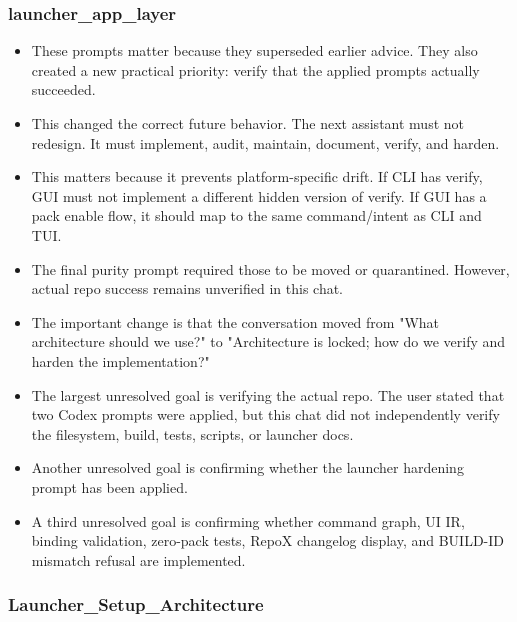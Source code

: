 \documentclass[11pt,a4paper]{report}
\begin{document}
\subsubsection{launcher\_app\_layer}

\begin{itemize}
\item These prompts matter because they superseded earlier advice. They also created a new practical priority: verify that the applied prompts actually succeeded.
\item This changed the correct future behavior. The next assistant must not redesign. It must implement, audit, maintain, document, verify, and harden.
\item This matters because it prevents platform-specific drift. If CLI has verify, GUI must not implement a different hidden version of verify. If GUI has a pack enable flow, it should map to the same command/intent as CLI and TUI.
\item The final purity prompt required those to be moved or quarantined. However, actual repo success remains unverified in this chat.
\item The important change is that the conversation moved from "What architecture should we use?" to "Architecture is locked; how do we verify and harden the implementation?"
\item The largest unresolved goal is verifying the actual repo. The user stated that two Codex prompts were applied, but this chat did not independently verify the filesystem, build, tests, scripts, or launcher docs.
\item Another unresolved goal is confirming whether the launcher hardening prompt has been applied.
\item A third unresolved goal is confirming whether command graph, UI IR, binding validation, zero-pack tests, RepoX changelog display, and BUILD-ID mismatch refusal are implemented.
\end{itemize}

\subsubsection{Launcher\_Setup\_Architecture}
\end{document}
